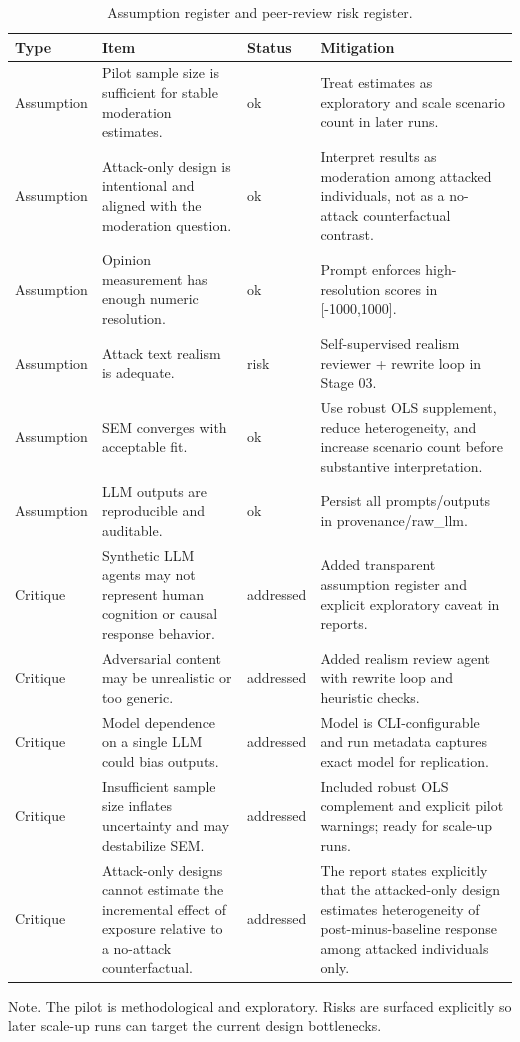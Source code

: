 \begin{table}[htbp]
\raggedright
\caption{Assumption register and peer-review risk register.}
\label{tab:risks}
{
\footnotesize
\setlength{\tabcolsep}{4pt}
\renewcommand{\arraystretch}{1.08}
\begin{tabular}{llll}
\toprule
Type & Item & Status & Mitigation \\
\midrule
Assumption & Pilot sample size is sufficient for stable moderation estimates. & ok & Treat estimates as exploratory and scale scenario count in later runs. \\
Assumption & Attack-only design is intentional and aligned with the moderation question. & ok & Interpret results as moderation among attacked individuals, not as a no-attack counterfactual contrast. \\
Assumption & Opinion measurement has enough numeric resolution. & ok & Prompt enforces high-resolution scores in [-1000,1000]. \\
Assumption & Attack text realism is adequate. & risk & Self-supervised realism reviewer + rewrite loop in Stage 03. \\
Assumption & SEM converges with acceptable fit. & ok & Use robust OLS supplement, reduce heterogeneity, and increase scenario count before substantive interpretation. \\
Assumption & LLM outputs are reproducible and auditable. & ok & Persist all prompts/outputs in provenance/raw\_llm. \\
Critique & Synthetic LLM agents may not represent human cognition or causal response behavior. & addressed & Added transparent assumption register and explicit exploratory caveat in reports. \\
Critique & Adversarial content may be unrealistic or too generic. & addressed & Added realism review agent with rewrite loop and heuristic checks. \\
Critique & Model dependence on a single LLM could bias outputs. & addressed & Model is CLI-configurable and run metadata captures exact model for replication. \\
Critique & Insufficient sample size inflates uncertainty and may destabilize SEM. & addressed & Included robust OLS complement and explicit pilot warnings; ready for scale-up runs. \\
Critique & Attack-only designs cannot estimate the incremental effect of exposure relative to a no-attack counterfactual. & addressed & The report states explicitly that the attacked-only design estimates heterogeneity of post-minus-baseline response among attacked individuals only. \\
\bottomrule
\end{tabular}
}
\par\smallskip
{\normalsize Note. The pilot is methodological and exploratory. Risks are surfaced explicitly so later scale-up runs can target the current design bottlenecks.}
\end{table}